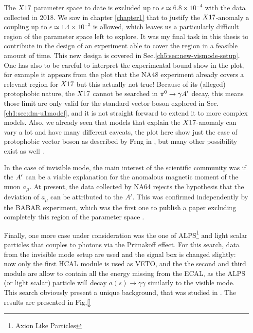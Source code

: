 The $X17$ parameter space to date is excluded up to $\epsilon \simeq 6.8 \times 10^{-4}$ with the data collected in 2018. We saw in chapter \ref{chapter1} that to justify the $X17$-anomaly a coupling up to $\epsilon \simeq 1.4 \times 10^{-3}$ is allowed, which leaves us a particularly difficult region of the parameter space left to explore. It was my final task in this thesis to contribute in the design of an experiment able to cover the region in a feasible amount of time. This new design is covered in Sec.\ref{ch5:sec:new-vismode-setup}. One has also to be careful to interpret the experimental bound show in the plot, for example it appears from the plot that the NA48 experiment already covers a relevant region for $X17$ but this actually not true! Because of its (alleged) protophobic nature, the $X17$ cannot be searched in $\pi^0 \rightarrow \gamma A'$ decay, this means those limit are only valid for the standard vector boson explored in Sec.\ref{ch1:sec:dm-u1model}, and it is not straight forward to extend it to more complex models. Also, we already seen that models that explain the $X17$-anomaly can vary a lot and have many different caveats, the plot here show just the case of protophobic vector boson as described by Feng in \cite{Feng:2016jff}, but many other possibility exist as well \cite{PhysRevD.95.035017}.

In the case of invisible mode, the main interest of the scientific community was if the $A'$ can be a viable explanation for the anomalous magnetic moment of the muon $a_{\mu}$. At present, the data collected by NA64 rejects the hypothesis that the deviation of $a_{\mu}$ can be attributed to the $A'$. This was confirmed independently by the BABAR experiment, which was the first one to publish a paper excluding completely this region of the parameter space \cite{PhysRevLett.119.131804}.

Finally, one more case under consideration was the one of ALPS\footnote{Axion Like Particles} and light scalar particles that couples to photons via the Primakoff effect. For this search, data from the invisible mode setup are used and the signal box is changed slightly: now only the first HCAL module is used as VETO, and the the second and third module are allow to contain all the energy missing from the ECAL, as the ALPS (or light scalar) particle will decay $a(s) \rightarrow \gamma \gamma$ similarly to the visible mode. This search obviously present a unique background, that was studied in \cite{Banerjee:2020fue}. The results are presented in Fig.\ref{}

